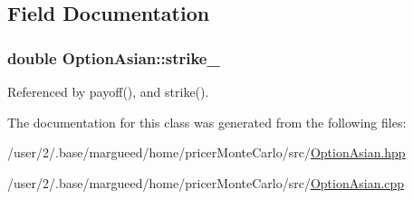 \subsection{Field Documentation}
\hypertarget{classOptionAsian_a2b1952985f78ae8fd471275556fec724}{
\subsubsection[{strike\-\_\-}]{\setlength{\rightskip}{0pt plus 5cm}double Option\-Asian\-::strike\-\_\-\hspace{0.3cm}{\ttfamily [protected]}}}\label{classOptionAsian_a2b1952985f78ae8fd471275556fec724}


Referenced by payoff(), and strike().



The documentation for this class was generated from the following files\-:\begin{DoxyCompactItemize}
\item 
/user/2/.\-base/margueed/home/pricer\-Monte\-Carlo/src/\hyperlink{OptionAsian_8hpp}{Option\-Asian.\-hpp}\item 
/user/2/.\-base/margueed/home/pricer\-Monte\-Carlo/src/\hyperlink{OptionAsian_8cpp}{Option\-Asian.\-cpp}\end{DoxyCompactItemize}
